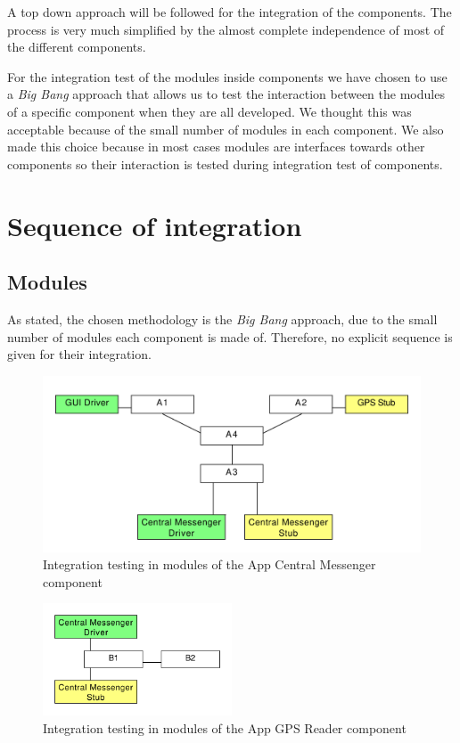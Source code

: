 A top down approach will be followed for the integration of the components. The process is very much simplified by the almost complete independence of most of the different components.

For the integration test of the modules inside components we have chosen to use a \emph{Big Bang} approach that allows us to test the interaction between the modules of a specific component when they are all developed. We thought this was acceptable because of the small number of modules in each component. We also made this choice because in most cases modules are interfaces towards other components so their interaction is tested during integration test of components.


\section{Sequence of integration}

\subsection{Modules}
As stated, the chosen methodology is the \emph{Big Bang} approach, due to the small number of modules each component is made of. Therefore, no explicit sequence is given for their integration.

\begin{figure}
\centering
\includegraphics[width=\textwidth]{tex-images/mod-1}
\caption{Integration testing in modules of the App Central Messenger component}
\end{figure}

\begin{figure}
\centering
\includegraphics[width=0.5\textwidth]{tex-images/mod-2}
\caption{Integration testing in modules of the App GPS Reader component}
\end{figure}

